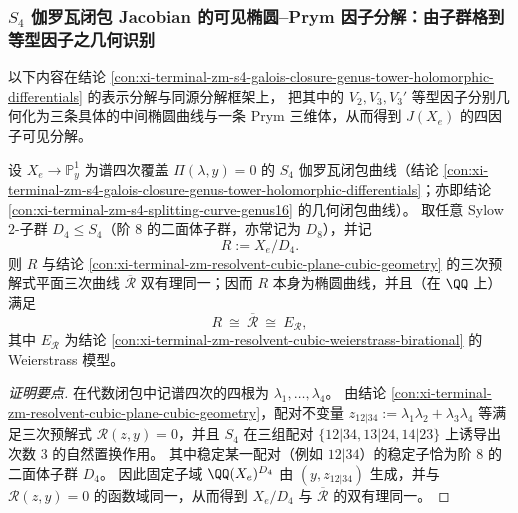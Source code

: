 \subsubsection{\texorpdfstring{$S_4$}{S4} 伽罗瓦闭包 Jacobian 的可见椭圆--Prym 因子分解：由子群格到等型因子之几何识别}\label{subsubsec:xi-s4-visible-jacobian-prym-factorization}
以下内容在结论 \ref{con:xi-terminal-zm-s4-galois-closure-genus-tower-holomorphic-differentials} 的表示分解与同源分解框架上，
把其中的 \(V_2,V_3,V_3'\) 等型因子分别几何化为三条具体的中间椭圆曲线与一条 Prym 三维体，从而得到 \(J(X_e)\) 的四因子可见分解。

\begin{conclusion}\label{con:xi-terminal-zm-s4-d4fixedfield-resolvent-elliptic}
设 \(X_e\to\mathbb P^1_y\) 为谱四次覆盖 \(\Pi(\lambda,y)=0\) 的 \(S_4\) 伽罗瓦闭包曲线（结论 \ref{con:xi-terminal-zm-s4-galois-closure-genus-tower-holomorphic-differentials}；亦即结论 \ref{con:xi-terminal-zm-s4-splitting-curve-genus16} 的几何闭包曲线）。
取任意 Sylow \(2\)-子群 \(D_{4}\le S_{4}\)（阶 \(8\) 的二面体子群，亦常记为 \(D_{8}\)），并记
\[
R:=X_e/D_{4}.
\]
则 \(R\) 与结论 \ref{con:xi-terminal-zm-resolvent-cubic-plane-cubic-geometry} 的三次预解式平面三次曲线 \(\overline{\mathcal R}\) 双有理同一；因而 \(R\) 本身为椭圆曲线，并且（在 \(\QQ\) 上）满足
\[
R\ \cong\ \overline{\mathcal R}\ \cong\ E_{\mathscr R},
\]
其中 \(E_{\mathscr R}\) 为结论 \ref{con:xi-terminal-zm-resolvent-cubic-weierstrass-birational} 的 Weierstrass 模型。
\end{conclusion}
\begin{proof}[证明要点]
在代数闭包中记谱四次的四根为 \(\lambda_1,\dots,\lambda_4\)。
由结论 \ref{con:xi-terminal-zm-resolvent-cubic-plane-cubic-geometry}，配对不变量
\(
z_{12|34}:=\lambda_1\lambda_2+\lambda_3\lambda_4
\)
等满足三次预解式 \(\mathscr R(z,y)=0\)，并且 \(S_4\) 在三组配对 \(\{12|34,13|24,14|23\}\) 上诱导出次数 \(3\) 的自然置换作用。
其中稳定某一配对（例如 \(12|34\)）的稳定子恰为阶 \(8\) 的二面体子群 \(D_4\)。
因此固定子域 \(\QQ(X_e)^{D_4}\) 由 \((y,z_{12|34})\) 生成，并与 \(\mathscr R(z,y)=0\) 的函数域同一，从而得到 \(X_e/D_4\) 与 \(\overline{\mathcal R}\) 的双有理同一。
\end{proof}

